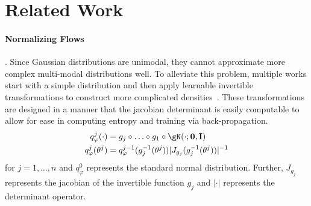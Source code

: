 \section{Related Work}
%
%
%
%
%
%
%

%

%

%
%
%
%
%

\paragraph{Normalizing Flows}. Since Gaussian distributions are unimodal, they cannot approximate more complex multi-modal distributions well. To alleviate this problem, multiple works start with a simple distribution and then apply learnable invertible transformations to construct more complicated densities~\citep{rezende2015variational,kobyzev2020normalizing,papamakarios2021normalizing,kingma2016improved}. These transformations are designed in a manner that the jacobian determinant is easily computable to allow for ease in computing entropy and training via back-propagation.
\begin{align}
    q^j_\varphi(\cdot) &= g_j \circ \ldots \circ g_1 \circ \gN(\cdot; \bf{0}, \bf{I}) \\
    q_\varphi^j(\theta^j) &= q^{j-1}_\varphi(g_j^{-1}(\theta^j)) |J_{g_j}(g_j^{-1}(\theta^j))|^{-1}
\end{align}
for $j = 1, \ldots, n$ and $q_\varphi^0$ represents the standard normal distribution. Further, $J_{g_j}$ represents the jacobian of the invertible function $g_j$ and $|\cdot|$ represents the determinant operator.

